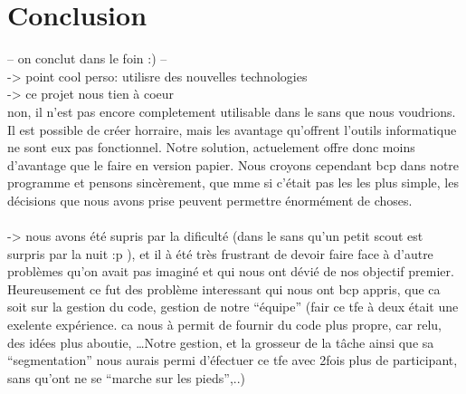 \section{Conclusion}

-- on conclut dans le foin :) --\\

->  point cool perso: utilisre des nouvelles technologies \\

->  ce projet nous tien à coeur \\
non, il n'est pas encore completement utilisable dans le sans que nous voudrions.
Il est possible de créer horraire, mais les avantage qu'offrent l'outils informatique ne sont eux pas fonctionnel. Notre solution, actuelement offre donc moins d'avantage que le faire en version papier.  Nous croyons cependant bcp dans notre programme et pensons sincèrement, que mme si c'était pas les les plus simple, les décisions que nous avons prise peuvent permettre énormément de choses.  \\\\

-> nous avons été supris par la dificulté (dans le sans qu'un petit scout est
surpris par la nuit :p ), et il à été très frustrant de devoir faire face à
d'autre problèmes qu'on avait pas imaginé et qui nous ont dévié de nos objectif
premier.  Heureusement ce fut des problème interessant qui nous ont bcp appris,
que ca soit sur la gestion du code, gestion de notre ``équipe'' (fair ce tfe à
deux était une exelente expérience. ca nous à permit de fournir du code plus
propre, car relu, des idées plus aboutie, \ldots Notre gestion, et la grosseur
de la tâche ainsi que sa ``segmentation'' nous aurais permi d'éfectuer ce tfe
avec 2fois plus de participant, sans qu'ont ne se ``marche sur les pieds'',..)
